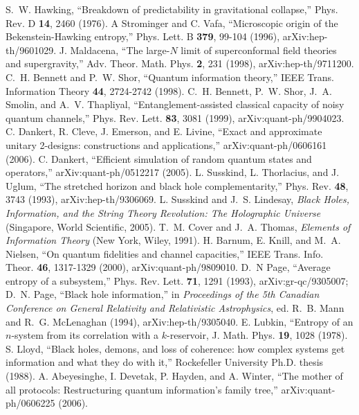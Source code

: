 \documentclass[11pt]{article}
\begin{document}
\begin{thebibliography}{99}
 S.~W. Hawking, ``Breakdown of predictability in gravitational collapse,'' Phys. Rev. D {\bf 14}, 2460 (1976).
 A Strominger and C. Vafa, ``Microscopic origin of the Bekenstein-Hawking entropy,'' Phys. Lett. B {\bf 379}, 99-104 (1996), arXiv:hep-th/9601029.
 J. Maldacena, ``The large-$N$ limit of superconformal field theories and supergravity,'' Adv. Theor. Math. Phys. {\bf 2}, 231 (1998), arXiv:hep-th/9711200.
 C.~H. Bennett and P.~W. Shor, ``Quantum information theory,'' IEEE Trans. Information Theory {\bf 44}, 2724-2742 (1998).
 C.~H. Bennett, P.~W. Shor, J.~A. Smolin, and A.~V. Thapliyal, ``Entanglement-assisted classical capacity of noisy quantum channels,'' Phys. Rev. Lett. {\bf 83}, 3081 (1999), arXiv:quant-ph/9904023.
 C. Dankert, R. Cleve, J. Emerson, and E. Livine, ``Exact and approximate unitary 2-designs: constructions and applications,'' arXiv:quant-ph/0606161 (2006).
 C. Dankert, ``Efficient simulation of random quantum states and operators,''  arXiv:quant-ph/0512217 (2005).
 L. Susskind, L. Thorlacius, and J. Uglum, ``The stretched horizon and black hole complementarity,'' Phys. Rev. {\bf 48}, 3743 (1993), arXiv:hep-th/9306069.
 L. Susskind and J.~S. Lindesay, {\em Black Holes, Information, and the String Theory Revolution: The Holographic Universe} (Singapore, World Scientific, 2005).
 T.~M. Cover and J.~A. Thomas, {\em Elements of Information Theory} (New York, Wiley, 1991).
 H. Barnum, E. Knill, and M.~A. Nielsen, ``On quantum fidelities and channel capacities,'' IEEE Trans. Info. Theor. {\bf 46}, 1317-1329 (2000), arXiv:quant-ph/9809010.
 D.~N Page, ``Average entropy of a subsystem,'' Phys. Rev. Lett. {\bf 71}, 1291 (1993), arXiv:gr-qc/9305007; D.~N. Page, ``Black hole information,'' in {\em Proceedings of the 5th Canadian Conference on General Relativity and Relativistic Astrophysics}, ed. R.~B. Mann and R.~G. McLenaghan (1994), arXiv:hep-th/9305040.
 E. Lubkin, ``Entropy of an $n$-system from its correlation with a $k$-reservoir, J. Math. Phys. {\bf 19}, 1028 (1978).
 S. Lloyd, ``Black holes, demons, and loss of coherence: how complex systems get information and what they do with it,'' Rockefeller University Ph.D. thesis (1988).
 A. Abeyesinghe, I. Devetak, P. Hayden, and A. Winter, ``The mother of all protocols: Restructuring quantum information's family tree,'' arXiv:quant-ph/0606225 (2006).

\end{thebibliography}
\end{document}
